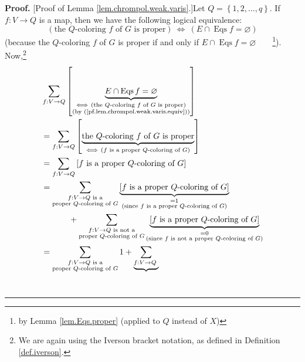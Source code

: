 \documentclass[numbers=enddot,12pt,final,onecolumn,notitlepage]{scrartcl}%
\theoremstyle{definition}
\newenvironment{proof}[1][Proof]{\noindent\textbf{#1.} }{\ \rule{0.5em}{0.5em}}
\newenvironment{verlong}{}{}
\let\sumnonlimits\sum
\renewcommand{\sum}{\sumnonlimits\limits}
\begin{document}
\begin{verlong}
\begin{proof}
[Proof of Lemma \ref{lem.chrompol.weak.varis}.]Let $Q=\left\{  1,2,\ldots
,q\right\}  $. If $f:V\rightarrow Q$ is a map, then we have the following
logical equivalence:%
\begin{equation}
\left(  \text{the }Q\text{-coloring }f\text{ of }G\text{ is proper}\right)
\ \Longleftrightarrow\ \left(  E\cap\operatorname*{Eqs}f=\varnothing\right)
\label{pf.lem.chrompol.weak.varis.equiv}%
\end{equation}
(because the $Q$-coloring $f$ of $G$ is proper if and only if $E\cap
\operatorname*{Eqs}f=\varnothing$\ \ \ \ \footnote{by Lemma
\ref{lem.Eqs.proper} (applied to $Q$ instead of $X$)}). Now,\footnote{We are
again using the Iverson bracket notation, as defined in Definition
\ref{def.iverson}.}%
\begin{align}
&  \sum_{f:V\rightarrow Q}\left[  \underbrace{E\cap\operatorname*{Eqs}%
f=\varnothing}_{\substack{\Longleftrightarrow\ \left(  \text{the
}Q\text{-coloring }f\text{ of }G\text{ is proper}\right)  \\\text{(by
(\ref{pf.lem.chrompol.weak.varis.equiv}))}}}\right] \nonumber\\
&  =\sum_{f:V\rightarrow Q}\left[  \underbrace{\text{the }Q\text{-coloring
}f\text{ of }G\text{ is proper}}_{\Longleftrightarrow\ \left(  f\text{ is a
proper }Q\text{-coloring of }G\right)  }\right] \nonumber\\
&  =\sum_{f:V\rightarrow Q}\left[  f\text{ is a proper }Q\text{-coloring of
}G\right] \nonumber\\
&  =\sum_{\substack{f:V\rightarrow Q\text{ is a}\\\text{proper }%
Q\text{-coloring of }G}}\underbrace{\left[  f\text{ is a proper }%
Q\text{-coloring of }G\right]  }_{\substack{=1\\\text{(since }f\text{ is a
proper }Q\text{-coloring of }G\text{)}}}\nonumber\\
&  \ \ \ \ \ \ \ \ \ \ +\sum_{\substack{f:V\rightarrow Q\text{ is not
a}\\\text{proper }Q\text{-coloring of }G}}\underbrace{\left[  f\text{ is a
proper }Q\text{-coloring of }G\right]  }_{\substack{=0\\\text{(since }f\text{
is not a proper }Q\text{-coloring of }G\text{)}}}\nonumber\\
&  =\sum_{\substack{f:V\rightarrow Q\text{ is a}\\\text{proper }%
Q\text{-coloring of }G}}1+\underbrace{\sum_{\substack{f:V\rightarrow Q\text{
}}}}
\end{align}
\end{proof}
\end{verlong}
\end{document}
